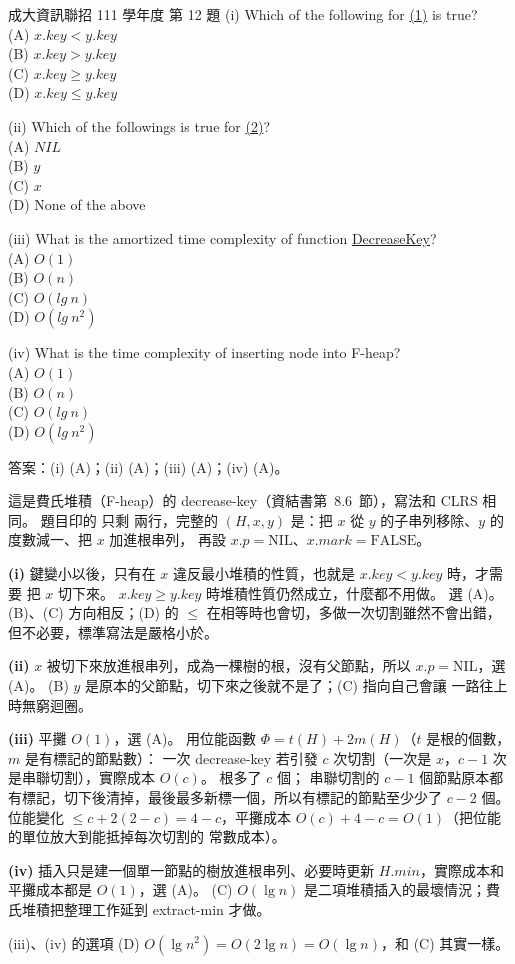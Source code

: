 \begin{pastexam}[label={px:ncku-111-prog-12}]{成大資訊聯招 111 學年度 第 12 題}
(i) Which of the following for \underline{(1)} is true?\\
(A) $x.key < y.key$\\
(B) $x.key > y.key$\\
(C) $x.key \ge y.key$\\
(D) $x.key \le y.key$

(ii) Which of the followings is true for \underline{(2)}?\\
(A) $NIL$\\
(B) $y$\\
(C) $x$\\
(D) None of the above

(iii) What is the amortized time complexity of function \underline{DecreaseKey}?\\
(A) $O(1)$\\
(B) $O(n)$\\
(C) $O(lg\ n)$\\
(D) $O(lg\ n^2)$

(iv) What is the time complexity of inserting node into F-heap?\\
(A) $O(1)$\\
(B) $O(n)$\\
(C) $O(lg\ n)$\\
(D) $O(lg\ n^2)$
\end{pastexam}

\begin{pastsoln}
答案：(i) (A)；(ii) (A)；(iii) (A)；(iv) (A)。

這是費氏堆積（F-heap）的 decrease-key（資結書第~8.6~節），寫法和 CLRS 相同。 題目印的  只剩
兩行，完整的 $(H, x, y)$ 是：把 $x$ 從 $y$ 的子串列移除、$y$ 的度數減一、把 $x$ 加進根串列，
再設 $x.p = \mathrm{NIL}$、$x.\mathit{mark} = \mathrm{FALSE}$。

\textbf{(i)} 鍵變小以後，只有在 $x$ 違反最小堆積的性質，也就是 $x.\mathit{key} < y.\mathit{key}$ 時，才需要
把 $x$ 切下來。 $x.\mathit{key} \ge y.\mathit{key}$ 時堆積性質仍然成立，什麼都不用做。 選 (A)。 (B)、(C)
方向相反；(D) 的 $\le$ 在相等時也會切，多做一次切割雖然不會出錯，但不必要，標準寫法是嚴格小於。

\textbf{(ii)} $x$ 被切下來放進根串列，成為一棵樹的根，沒有父節點，所以 $x.p = \mathrm{NIL}$，選 (A)。 (B)
$y$ 是原本的父節點，切下來之後就不是了；(C) 指向自己會讓  一路往上時無窮迴圈。

\textbf{(iii)} 平攤 $O(1)$，選 (A)。 用位能函數 $\Phi = t(H) + 2m(H)$（$t$ 是根的個數，$m$ 是有標記的節點數）：
一次 decrease-key 若引發 $c$ 次切割（一次是 $x$，$c - 1$ 次是串聯切割），實際成本 $O(c)$。 根多了 $c$ 個；
串聯切割的 $c - 1$ 個節點原本都有標記，切下後清掉，最後最多新標一個，所以有標記的節點至少少了 $c - 2$ 個。
位能變化 $\le c + 2(2 - c) = 4 - c$，平攤成本 $O(c) + 4 - c = O(1)$（把位能的單位放大到能抵掉每次切割的
常數成本）。

\textbf{(iv)} 插入只是建一個單一節點的樹放進根串列、必要時更新 $H.\mathit{min}$，實際成本和平攤成本都是
$O(1)$，選 (A)。 (C) $O(\lg n)$ 是二項堆積插入的最壞情況；費氏堆積把整理工作延到 extract-min 才做。

(iii)、(iv) 的選項 (D) $O(\lg n^2) = O(2 \lg n) = O(\lg n)$，和 (C) 其實一樣。
\end{pastsoln}
